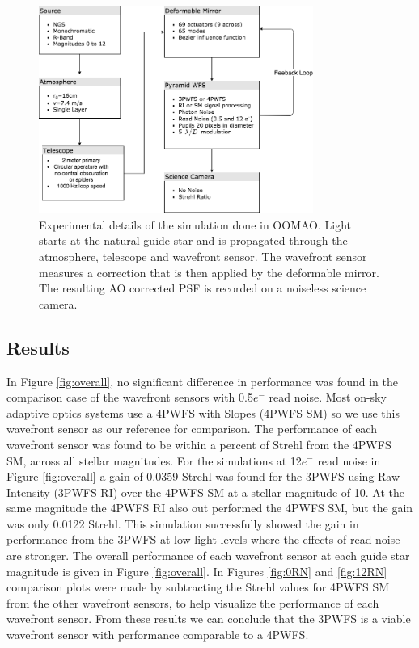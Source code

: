 \begin{figure}
    \centering
    \includegraphics[width=0.8\textwidth]{Chapter Materials/Chapter Four Materials/simulation.png}
    \caption{Experimental details of the simulation done in OOMAO. Light starts at the natural guide star and is propagated through the atmosphere, telescope and wavefront sensor. The wavefront sensor measures a correction that is then applied by the deformable mirror.  The resulting AO corrected PSF is recorded on a noiseless science camera. }
    \label{fig:simulationl}
\end{figure}

\subsection{Results}

In Figure \ref{fig:overall}, no significant difference in performance was found in the comparison case of the wavefront sensors with 0.5$e^-$ read noise. Most on-sky adaptive optics systems use a 4PWFS with Slopes (4PWFS SM) so we use this wavefront sensor as our reference for comparison. The performance of each wavefront sensor was found to be within a percent of Strehl from the 4PWFS SM, across all stellar magnitudes. For the simulations at 12$e^-$ read noise in Figure \ref{fig:overall} a gain of 0.0359 Strehl was found for the 3PWFS using Raw Intensity (3PWFS RI) over the 4PWFS SM at a stellar magnitude of 10. At the same magnitude the 4PWFS RI also out performed the 4PWFS SM, but the gain was only 0.0122 Strehl. This simulation successfully showed the gain in performance from the 3PWFS at low light levels where the effects of read noise are stronger. The overall performance of each wavefront sensor at each guide star magnitude is given in Figure \ref{fig:overall}. In Figures \ref{fig:0RN} and \ref{fig:12RN} comparison plots were made by subtracting the Strehl values for 4PWFS SM from the other wavefront sensors, to help visualize the performance of each wavefront sensor. From these results we can conclude that the 3PWFS is a viable wavefront sensor with performance comparable to a 4PWFS.


